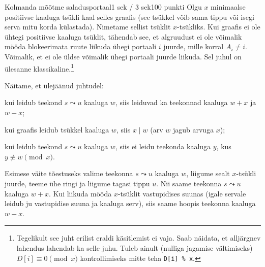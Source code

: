 \begin{yl}{5}{Kolmanda mõõtme saladus}{portaal}{1 sek / 3 sek}{100 punkti}
  Olgu $x$ minimaalse positiivse kaaluga tsükli kaal selles graafis (see tsükkel võib sama
  tippu või isegi serva mitu korda külastada). Nimetame sellist tsüklit $x$-tsükliks. Kui graafis ei ole
  ühtegi positiivse kaaluga tsüklit, tähendab see, et algruudust ei ole võimalik
  mööda blokeerimata ruute liikuda ühegi portaali $i$ juurde, mille korral $A_i \ne i$.
  Võimalik, et ei ole üldse võimalik ühegi portaali juurde liikuda. Sel juhul on
  ülesanne klassikaline.\footnote{Tegelikult see juht erilist eraldi käsitlemist ei vaja.
    Saab näidata, et alljärgnev lahendus lahendab ka selle juhu. Tuleb ainult
    (nulliga jagamise vältimiseks) $D[i] \equiv 0 \pmod{x}$ kontrollimiseks mitte
    teha \texttt{D[i] \% x}.}

  Näitame, et ülejäänud juhtudel:
  \begin{xitem}
  \item kui leidub teekond $s \leadsto u$ kaaluga $w$, siis leiduvad ka teekonnad
    kaaluga $w + x$ ja $w - x$;
  \item kui graafis leidub tsükkel kaaluga $w$, siis $x \mid w$ (arv $w$ jagub arvuga $x$);
  \item kui leidub teekond $s \leadsto u$ kaaluga $w$, siis ei leidu teekonda
    kaaluga $y$, kus $y \not\equiv w \pmod{x}$.
  \end{xitem}

  Esimese väite tõestuseks valime teekonna $s \leadsto u$ kaaluga $w$, liigume
  sealt $x$-tsükli juurde, teeme ühe ringi ja liigume tagasi tippu $u$.
  Nii saame teekonna $s \leadsto u$ kaaluga $w + x$. Kui liikuda mööda $x$-tsüklit vastupidises
  suunas (igale servale leidub ju vastupidise suuna ja kaaluga serv), siis saame hoopis
  teekonna kaaluga $w - x$.

  \begin{center}
\end{center}
\end{yl}
